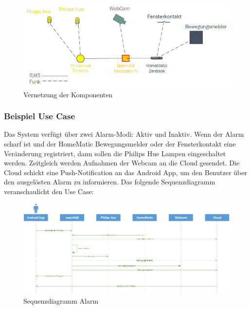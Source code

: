 \begin{figure}[H]
	\centering
		\includegraphics[scale=1]{report/img/vernetzung}
	\caption{Vernetzung der Komponenten}
	\label{fig:componentsIntegration}
\end{figure}

\subsubsection{Beispiel Use Case}
Das System verfügt über zwei Alarm-Modi: Aktiv und Inaktiv. Wenn der Alarm scharf ist und der HomeMatic Bewegungsmelder oder der Fensterkontakt eine Veränderung registriert, dann sollen die Philips Hue Lampen eingeschaltet werden. Zeitgleich werden Aufnahmen der Webcam an die Cloud gesendet. Die Cloud schickt eine Push-Notification an das Android App, um den Benutzer über den ausgelösten Alarm zu informieren. Das folgende Sequenzdiagramm veranschaulicht den Use Case:

\begin{figure}[H]
	\centering
		\includegraphics[width=\textwidth]{report/img/sequence_alarm.png}
	\caption{Sequenzdiagramm Alarm}
	\label{fig:sequenceAlarm}
\end{figure}


